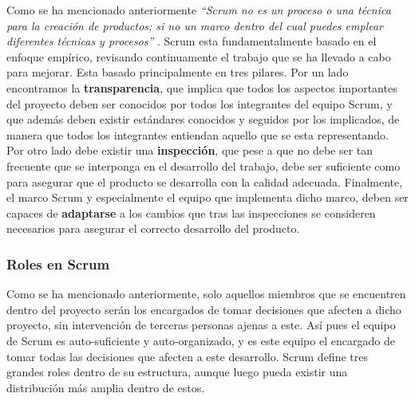 Como se ha mencionado anteriormente \textit{``Scrum no es un proceso o una técnica para la creación de productos; si no un marco dentro del cual puedes emplear diferentes técnicas y procesos''} \cite{ScrumGuide}. Scrum esta fundamentalmente basado en el enfoque empírico, revisando continuamente el trabajo que se ha llevado a cabo para mejorar. Esta basado principalmente en tres pilares. Por un lado encontramos la \textbf{transparencia}, que implica que todos los aspectos importantes del proyecto deben ser conocidos por todos los integrantes del equipo Scrum, y que además deben existir estándares conocidos y seguidos por los implicados, de manera que todos los integrantes entiendan aquello que se esta representando. Por otro lado debe existir una \textbf{inspección}, que pese a que no debe ser tan frecuente que se interponga en el desarrollo del trabajo, debe ser suficiente como para asegurar que el producto se desarrolla con la calidad adecuada. Finalmente, el marco Scrum y especialmente el equipo que implementa dicho marco, deben ser capaces de \textbf{adaptarse} a los cambios que tras las inspecciones se consideren necesarios para asegurar el correcto desarrollo del producto.

\subsubsection{Roles en Scrum}

Como se ha mencionado anteriormente, solo aquellos miembros que se encuentren dentro del proyecto serán los encargados de tomar decisiones que afecten a dicho proyecto, sin intervención de terceras personas ajenas a este. Así pues el equipo de Scrum es auto-suficiente y auto-organizado, y es este equipo el encargado de tomar todas las decisiones que afecten a este desarrollo. Scrum define tres grandes roles dentro de su estructura, aunque luego pueda existir una distribución más amplia dentro de estos.

